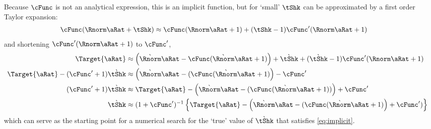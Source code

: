 \documentclass[../BufferStockTheory.tex]{subfiles}\usepackage{ApndxSteadyState}
\begin{document}
  \begin{comment}
    For any given current value $\point$ (and treating $\Nxt{\pShk}$ and $\Nxt{\Rnorm}=\Rfree (\PGro \Nxt{\pShk})^{-1}$ as predetermined).
    \begin{equation}\begin{gathered}\begin{aligned}
      \Target{\point}(\tShk) & = 
                               \Nxt{\Rnorm} \point + \Nxt{\tShk} - \cFunc(\Nxt{\Rnorm}\point+\Nxt{\tShk})
                               \label{eq:implicit}
    \end{aligned}\end{gathered}\end{equation}
  \end{comment}
  Because $\cFunc$ is not an analytical expression, this is an implicit function, but for `small' $\tShk$ can be approximated by
  a first order Taylor expansion:
  \begin{equation}\begin{gathered}\begin{aligned}
    \cFunc(\Rnorm \point + \tShk) & \approx   \cFunc(\Rnorm \point + 1)+ (\tShk-1)\cFunc^{\prime}(\Rnorm \point + 1)
  \end{aligned}\end{gathered}\end{equation}
  and shortening $\cFunc^{\prime}(\Rnorm \point + 1)$ to $\cFunc^{\prime}$,
  \begin{equation}\begin{gathered}\begin{aligned}
    \Target{\point} & \approx \left(
                      \Nxt{\Rnorm} \point  - \cFunc(\Nxt{\Rnorm}\point+1)
                      \right)
                      +\Nxt{\tShk}+(\Nxt{\tShk}-1)\cFunc^{\prime}(\Rnorm \point + 1)
    \\ \Target{\point} -(\cFunc^{\prime}+1)\Nxt{\tShk} & \approx  \left(\Nxt{\Rnorm} \point  - (\cFunc(\Nxt{\Rnorm}\point+1)\right)-\cFunc^{\prime}
    \\  (\cFunc^{\prime}+1)\Nxt{\tShk} & \approx \Target{\point}- \left(\Nxt{\Rnorm} \point  - (\cFunc(\Nxt{\Rnorm}\point+1))\right)+\cFunc^{\prime}                                             \\  \Nxt{\tShk} & \approx  (1+\cFunc^{\prime})^{-1}\left\{\Target{\point}- \left(\Nxt{\Rnorm} \point  - (\cFunc(\Nxt{\Rnorm}\point+1)\right)+\cFunc^{\prime})\right\}
  \end{aligned}\end{gathered}\end{equation}
  which can serve as the starting point for a numerical search for the `true' value of $\Nxt{\tShk}$ that satisfies \eqref{eq:implicit}.
\end{document}
